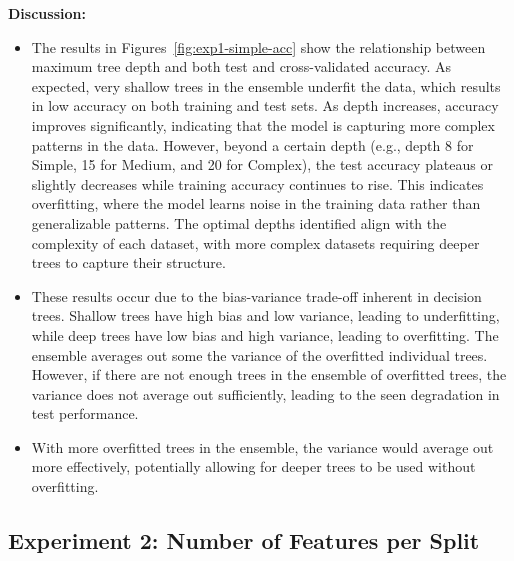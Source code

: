 \documentclass[conference]{IEEEtran}
\begin{document}
\textbf{Discussion:}
\begin{itemize}
  \item The results in Figures~\ref{fig:exp1-simple-acc} show the relationship between maximum tree depth and both test and cross-validated 
  accuracy. As expected, very shallow trees in the ensemble underfit the data, which results in low accuracy on both training and test sets. As depth 
  increases, accuracy improves significantly, indicating that the model is capturing more complex patterns in the data. However, beyond a certain depth 
  (e.g., depth 8 for Simple, 15 for Medium, and 20 for Complex), the test accuracy plateaus or slightly decreases while training accuracy 
  continues to rise. This indicates overfitting, where the model learns noise in the training data rather than generalizable patterns. The optimal 
  depths identified align with the complexity of each dataset, with more complex datasets requiring deeper trees to capture their structure.
  \item These results occur due to the bias-variance trade-off inherent in decision trees. Shallow trees have high bias and low variance, leading to 
  underfitting, while deep trees have low bias and high variance, leading to overfitting. The ensemble averages out some the variance of the overfitted individual 
  trees. However, if there are not enough trees in the ensemble of overfitted trees, the variance does not average out sufficiently, leading to the seen 
  degradation in test performance.
    \item With more overfitted trees in the ensemble, the variance would average out more effectively, potentially allowing for deeper trees to be
    used without overfitting. 
  \end{itemize}

\subsection{Experiment 2: Number of Features per Split}
\label{sec:results-exp2}
\end{document}

